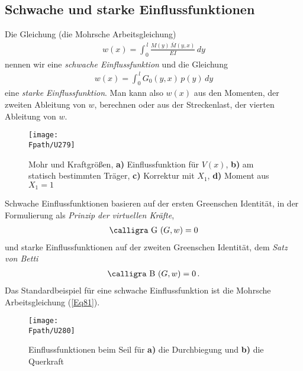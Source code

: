 {{{{%
{\textcolor{sectionTitleBlue}{\section{Schwache und starke Einflussfunktionen}}}
Die Gleichung (die Mohrsche Arbeitsgleichung)
\begin{align}\label{Eq81}
w(x) = \int_0^{\,l} \frac{M(y)\,\bar{M}(y,x)}{EI} \,dy
\end{align}
nennen wir eine {\em schwache Einflussfunktion\/} und die Gleichung
\begin{align}
w(x) = \int_0^{\,l} G_0(y,x)\,p(y)\,dy
\end{align}
eine {\em starke Einflussfunktion\/}. Man kann also $w(x)$ aus den Momenten, der zweiten Ableitung von $w$, berechnen oder aus der Streckenlast, der vierten Ableitung von $w$.
\begin{figure}[tbp]
\centering
\if {} \sidecaption \fi
\texttt{[image: \\Fpath/U279]}
\caption{Mohr und Kraftgr\"{o}{\ss}en, \textbf{ a)} Einflussfunktion f\"{u}r $V(x)$, \textbf{ b)} am statisch bestimmten Tr\"{a}ger, \textbf{ c)} Korrektur mit $X_1$, \textbf{ d) } Moment aus $X_1 = 1$ } \label{U279}
\end{figure}%

Schwache Einflussfunktionen basieren auf der ersten Greenschen Identit\"{a}t, in der Formulierung als {\em Prinzip der virtuellen Kr\"{a}fte\/},
\begin{align}
\text{\normalfont\calligra G\,\,}(G,w) = 0
\end{align}
und starke Einflussfunktionen auf der zweiten Greenschen Identit\"{a}t, dem {\em Satz von Betti\/}
\begin{align}
\text{\normalfont\calligra B\,\,}(G,w) = 0\,.
\end{align}
Das Standardbeispiel f\"{u}r eine schwache Einflussfunktion ist die Mohrsche Arbeitsgleichung (\ref{Eq81}).
\begin{figure}[tbp]
\centering
\if {} \sidecaption \fi
\texttt{[image: \\Fpath/U280]}
\caption{Einflussfunktionen beim Seil f\"{u}r \textbf{ a)} die Durchbiegung und \textbf{ b)} die Querkraft} \label{U280}
\end{figure}%

}}}}
